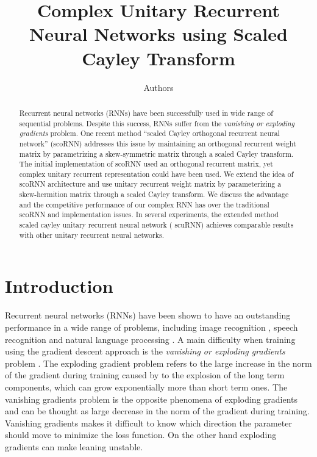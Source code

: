 \documentclass[letterpaper]{article} %
\begin{document}
%
\title{Complex Unitary Recurrent Neural Networks using Scaled Cayley Transform}
\author{Authors }
\maketitle
\begin{abstract}
Recurrent neural networks (RNNs) have been successfully used in wide range of sequential problems. Despite this success, RNNs suffer from the \textit{vanishing or exploding gradients} problem. One recent method “scaled Cayley orthogonal recurrent neural network” (scoRNN) addresses this issue by maintaining an orthogonal recurrent weight matrix by parametrizing a skew-symmetric matrix through a scaled Cayley transform. The initial implementation of scoRNN used an orthogonal recurrent matrix, yet complex unitary recurrent representation could have been used. We extend the idea of scoRNN architecture and use unitary recurrent weight matrix by parameterizing a skew-hermition matrix through a scaled Cayley transform. We discuss the advantage and the competitive performance of our complex RNN has over the traditional scoRNN and implementation issues. In several experiments, the extended method scaled cayley unitary recurrent neural network ( scuRNN) achieves comparable results with other unitary recurrent neural networks. 
\end{abstract}

\section{Introduction}
\noindent Recurrent neural networks (RNNs) have been shown to have an outstanding performance in a wide range of problems, including image recognition \cite{Krizh12}, speech recognition \cite{Hinton12} and natural language processing \cite{Collobert11}. A main difficulty when training using the gradient descent approach is the \textit{vanishing or exploding gradients} problem \cite{Hochreiter91}. The exploding gradient problem refers to the large increase in the norm of the gradient during training caused by to the explosion of the long term components, which can grow exponentially more than short term ones. The vanishing gradients problem is the opposite phenomena of exploding gradients and can be thought as large decrease in the norm of the gradient during training. Vanishing gradients makes it difficult to know which direction the parameter should move to minimize the loss function. On the other hand exploding gradients can make leaning unstable.\\ 
\end{document}

